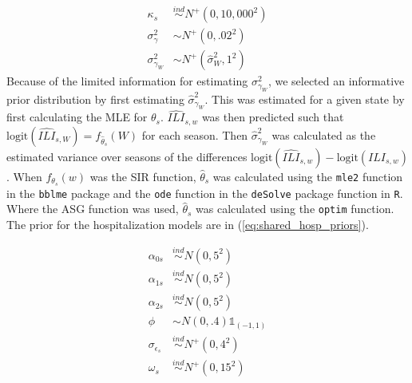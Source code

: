 \documentclass[ba]{imsart}
\theoremstyle{plain}
\theoremstyle{definition}
\theoremstyle{remark}
\begin{document}
\begin{equation}
\begin{aligned}
    \label{eq:shared_ili_priors}
        \kappa_s &\overset{ind}{\sim} N^+(0, 10,000^2) \\
        \sigma_{\gamma}^2 &\sim N^+(0, .02^2) \\
        \sigma_{\gamma_W}^2 &\sim N^+(\hat{\sigma}_W^2, 1^2)
\end{aligned}
\end{equation}
Because of the limited information for estimating $\sigma_{\gamma_W}^2$, we selected an informative prior distribution by first estimating  $\hat{\sigma}_{\gamma_W}^2$. This was estimated for a given state by first calculating the MLE for $\theta_s$. 
$\widehat{ILI}_{s,w}$ was then predicted such that $\text{logit}(\widehat{ILI}_{s,W}) = f_{\hat{\theta}_s}(W)$ for each season. Then $\hat{\sigma}_{\gamma_W}^2$ was calculated as the estimated variance over seasons of the differences $\text{logit}(\widehat{ILI}_{s,w}) - \text{logit}(ILI_{s,w})$. When $f_{\theta_s}(w)$ was the SIR function, $\widehat{\theta}_s$ was calculated using the \texttt{mle2} function in the \texttt{bblme} package \cite[]{bolker2023bblme} and the \texttt{ode} function in the \texttt{deSolve} package \cite[]{soetaert2010desolve} function in \texttt{R}. Where the ASG function was used,  $\hat{\theta}_s$ was calculated using the \texttt{optim} function.
The prior for the hospitalization models are in (\ref{eq:shared_hosp_priors}).

\begin{equation}
\begin{aligned}
\label{eq:shared_hosp_priors}
        \alpha_{0s} &\overset{ind}{\sim} N(0, 5^2)\\
        \alpha_{1s} &\overset{ind}{\sim} N(0, 5^2)\\
        \alpha_{2s} &\overset{ind}{\sim} N(0, 5^2) \\
        \phi &\sim N(0, .4)\mathbb{1}_{(-1,1)} \\
        \sigma_{\epsilon_s} &\overset{ind}{\sim} N^+(0, 4^2) \\
        \omega_s &\overset{ind}{\sim} N^+(0, 15^2)
\end{aligned}
\end{equation}
\end{document}
